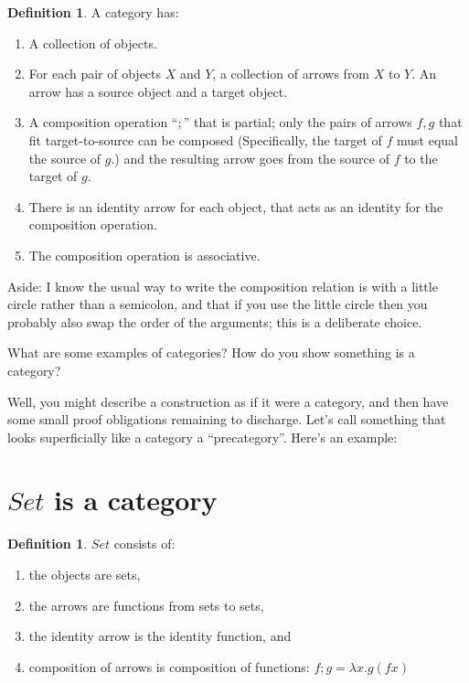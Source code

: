 \documentclass{proc-l}
\theoremstyle{definition}
\newtheorem{definition}[theorem]{Definition}
\theoremstyle{remark}
\numberwithin{equation}{section}
\begin{document}
\begin{definition}
\label{catdefn}
A category has:
\begin{enumerate}

\item A collection of objects.

\item For each pair of objects $X$ and $Y$, a collection of arrows from $X$ to $Y$. An arrow has a source object and a target object.

\item A composition operation ``$;$'' that is partial; only the pairs of arrows
$f, g$ that fit target-to-source can be composed (Specifically, the target of $f$ must equal the source of $g$.) and the resulting arrow goes from the source of $f$ to the target of $g$. 


\item There is an identity arrow for each object, that acts as an identity for the composition operation.

\item The composition operation is associative.

\end{enumerate}
\end{definition}

Aside: I know the usual way to write the composition relation is with a little circle rather than a semicolon, and that if you use the little circle then you probably also swap the order of the arguments; this is a deliberate choice.

What are some examples of categories? How do you show something is a category? 

Well, you might describe a construction as if it were a category, and then have some small proof obligations remaining to discharge. Let's call something that looks superficially like a category a ``precategory''. Here's an example:

\section{$Set$ is a category}

\begin{definition}
\label{setdefn}
$Set$ consists of:
\begin{enumerate}
    \item the objects are sets,
    \item the arrows are functions from sets to sets,
    \item the identity arrow is the identity function, and
    \item composition of arrows is composition of functions: $f ; g = \lambda x. g (f x)$
\end{enumerate}
\end{definition}
\end{document}
